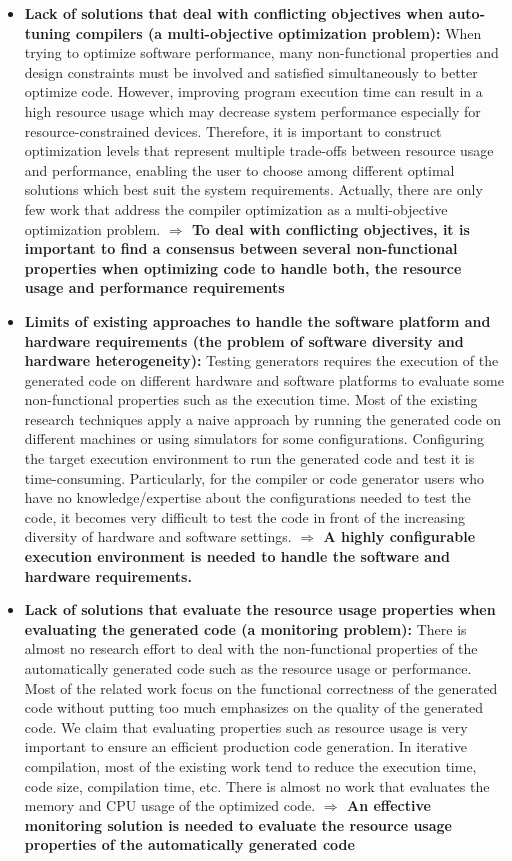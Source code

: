 \begin{itemize}
\item \textbf{Lack of solutions that deal with conflicting objectives when auto-tuning compilers (a multi-objective optimization problem):} 
When trying to optimize software performance, many non-functional properties and design constraints
must be involved and satisfied simultaneously to better optimize code. However, improving program
execution time can result in a high resource usage which may decrease system performance especially for resource-constrained devices. Therefore, it is important to construct optimization levels that represent multiple trade-offs between resource usage and performance, enabling the user to choose among different optimal solutions which best suit the system requirements. Actually, there are only few work that address the compiler optimization as a multi-objective optimization problem. 
\newline
\textbf{$\Rightarrow$ To deal with conflicting objectives, it is important to find a consensus between several non-functional properties when optimizing code to handle both, the resource usage and performance requirements}


\item \textbf{Limits of existing approaches to handle the software platform and hardware requirements (the problem of software diversity and hardware heterogeneity):} Testing generators requires the execution of the generated code on different hardware and software platforms to evaluate some non-functional properties such as the execution time. Most of the existing research techniques apply a naive approach by running the generated code on different machines or using simulators for some configurations. Configuring the target execution environment to run the generated code and test it is time-consuming. Particularly, for the compiler or code generator users who have no knowledge/expertise about the configurations needed to test the code, it becomes very difficult to test the code in front of the increasing diversity of hardware and software settings.\newline
\textbf{$\Rightarrow$ A highly configurable execution environment is needed to handle the software and hardware requirements.} 

\item \textbf{Lack of solutions that evaluate the resource usage properties when evaluating the generated code (a monitoring problem):} There is almost no research effort to deal with the non-functional properties of the automatically generated code such as the resource usage or performance. Most of the related work focus on the functional correctness of the generated code without putting too much emphasizes on the quality of the generated code. We claim that evaluating properties such as resource usage is very important to ensure an efficient production code generation. In iterative compilation, most of the existing work tend to reduce the execution time, code size, compilation time, etc. There is almost no work that evaluates the memory and CPU usage of the optimized code.
\newline
\textbf{$\Rightarrow$ An effective monitoring solution is needed to evaluate the resource usage properties of the automatically generated code}
  

\end{itemize}
